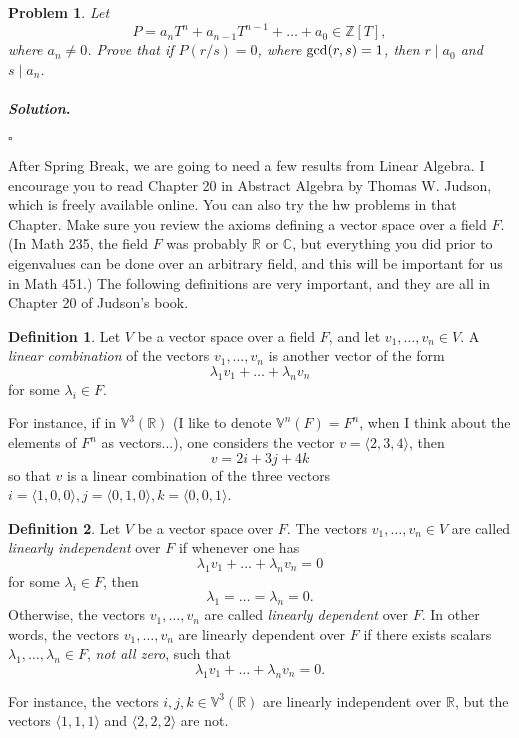 \documentclass[reqno]{amsart}
\theoremstyle{plain}
\newtheorem{problem}{Problem}
\theoremstyle{definition}
\newtheorem{definition}{Definition}
\newenvironment{solution}{\paragraph{\emph{Solution}.}}{\hfill$\square$}
\begin{document}
\begin{problem}
Let 
$$P = a_{n}T^{n} + a_{n-1}T^{n-1}+ \ldots + a_{0} \in \mathbb{Z}[T], $$
where $a_{n} \neq 0$.  Prove that if $P(r/s) = 0$, where ${\rm gcd}(r,s)=1$, then $r \mid a_{0}$ and $s \mid a_{n}$.
\end{problem}
\begin{solution}

\end{solution}

After Spring Break, we are going to need a few results from Linear Algebra.  I encourage you to read Chapter 20 in Abstract Algebra by Thomas W. Judson, which is freely available online.  You can also try the hw problems in that Chapter.  Make sure you review the axioms defining a vector space over a field $F$.  (In Math 235, the field $F$ was probably $\mathbb{R}$ or $\mathbb{C}$, but everything you did prior to eigenvalues can be done over an arbitrary field, and this will be important for us in Math 451.)  The following definitions are very important, and they are all in Chapter 20 of Judson's book.

\begin{definition}
Let $V$ be a vector space over a field $F$, and let $v_{1},\ldots,v_{n} \in V$.  A \emph{linear combination} of the vectors $v_{1},\ldots,v_{n}$ is another vector of the form
$$\lambda_{1}v_{1} + \ldots + \lambda_{n}v_{n} $$
for some $\lambda_{i} \in F$.
\end{definition}
For instance, if in $\mathbb{V}^{3}(\mathbb{R})$ (I like to denote $\mathbb{V}^{n}(F) = F^{n}$, when I think about the elements of $F^{n}$ as vectors...), one considers the vector $v = \langle 2,3,4 \rangle$, then 
$$ v = 2 i + 3 j + 4 k$$
so that $v$ is a linear combination of the three vectors $i = \langle 1,0,0\rangle, j = \langle 0,1,0 \rangle, k = \langle 0,0,1 \rangle$.

\begin{definition}
Let $V$ be a vector space over $F$.  The vectors $v_{1},\ldots,v_{n} \in V$ are called \emph{linearly independent} over $F$ if whenever one has
$$\lambda_{1}v_{1} + \ldots + \lambda_{n}v_{n} = 0 $$
for some $\lambda_{i} \in F$, then 
$$\lambda_{1} = \ldots = \lambda_{n}= 0. $$
Otherwise, the vectors $v_{1},\ldots,v_{n}$ are called \emph{linearly dependent} over $F$.  In other words, the vectors $v_{1},\ldots,v_{n}$ are linearly dependent over $F$ if there exists scalars $\lambda_{1},\ldots,\lambda_{n} \in F$, \emph{not all zero}, such that
$$\lambda_{1}v_{1}+\ldots+\lambda_{n}v_{n} = 0. $$
\end{definition}
For instance, the vectors $i,j,k \in \mathbb{V}^{3}(\mathbb{R})$ are linearly independent over $\mathbb{R}$, but the vectors $\langle 1,1,1 \rangle$ and $\langle 2,2,2 \rangle$ are not.  
\end{document}
